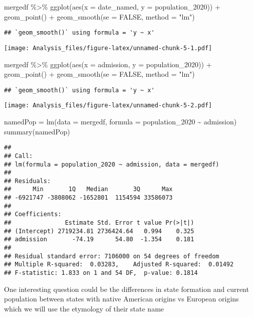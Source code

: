 \documentclass[
]{article}
\newenvironment{Shaded}{\begin{snugshade}}{\end{snugshade}}
\newcommand{\AttributeTok}[1]{\textcolor[rgb]{0.77,0.63,0.00}{#1}}
\newcommand{\ConstantTok}[1]{\textcolor[rgb]{0.00,0.00,0.00}{#1}}
\newcommand{\FunctionTok}[1]{\textcolor[rgb]{0.00,0.00,0.00}{#1}}
\newcommand{\NormalTok}[1]{#1}
\newcommand{\OtherTok}[1]{\textcolor[rgb]{0.56,0.35,0.01}{#1}}
\newcommand{\SpecialCharTok}[1]{\textcolor[rgb]{0.00,0.00,0.00}{#1}}
\newcommand{\StringTok}[1]{\textcolor[rgb]{0.31,0.60,0.02}{#1}}
\begin{document}
\begin{Shaded}
\begin{Highlighting}[]
\NormalTok{mergedf }\SpecialCharTok{\%\textgreater{}\%}
  \FunctionTok{ggplot}\NormalTok{(}\FunctionTok{aes}\NormalTok{(}\AttributeTok{x =}\NormalTok{ date\_named, }\AttributeTok{y =}\NormalTok{ population\_2020)) }\SpecialCharTok{+}
  \FunctionTok{geom\_point}\NormalTok{() }\SpecialCharTok{+}
  \FunctionTok{geom\_smooth}\NormalTok{(}\AttributeTok{se =} \ConstantTok{FALSE}\NormalTok{, }\AttributeTok{method =} \StringTok{"lm"}\NormalTok{)}
\end{Highlighting}
\end{Shaded}

\begin{verbatim}
## `geom_smooth()` using formula = 'y ~ x'
\end{verbatim}

\texttt{[image: Analysis\_files/figure-latex/unnamed-chunk-5-1.pdf]}

\begin{Shaded}
\begin{Highlighting}[]
\NormalTok{mergedf }\SpecialCharTok{\%\textgreater{}\%}
  \FunctionTok{ggplot}\NormalTok{(}\FunctionTok{aes}\NormalTok{(}\AttributeTok{x =}\NormalTok{ admission, }\AttributeTok{y =}\NormalTok{ population\_2020)) }\SpecialCharTok{+}
  \FunctionTok{geom\_point}\NormalTok{() }\SpecialCharTok{+}
  \FunctionTok{geom\_smooth}\NormalTok{(}\AttributeTok{se =} \ConstantTok{FALSE}\NormalTok{, }\AttributeTok{method =} \StringTok{"lm"}\NormalTok{)}
\end{Highlighting}
\end{Shaded}

\begin{verbatim}
## `geom_smooth()` using formula = 'y ~ x'
\end{verbatim}

\texttt{[image: Analysis\_files/figure-latex/unnamed-chunk-5-2.pdf]}

\begin{Shaded}
\begin{Highlighting}[]
\NormalTok{namedPop }\OtherTok{=} \FunctionTok{lm}\NormalTok{(}\AttributeTok{data =}\NormalTok{ mergedf, }\AttributeTok{formula =}\NormalTok{ population\_2020 }\SpecialCharTok{\textasciitilde{}}\NormalTok{ admission)}
\FunctionTok{summary}\NormalTok{(namedPop)}
\end{Highlighting}
\end{Shaded}

\begin{verbatim}
## 
## Call:
## lm(formula = population_2020 ~ admission, data = mergedf)
## 
## Residuals:
##      Min       1Q   Median       3Q      Max 
## -6921747 -3808062 -1652801  1154594 33586073 
## 
## Coefficients:
##               Estimate Std. Error t value Pr(>|t|)
## (Intercept) 2719234.81 2736424.64   0.994    0.325
## admission       -74.19      54.80  -1.354    0.181
## 
## Residual standard error: 7106000 on 54 degrees of freedom
## Multiple R-squared:  0.03283,    Adjusted R-squared:  0.01492 
## F-statistic: 1.833 on 1 and 54 DF,  p-value: 0.1814
\end{verbatim}

One interesting question could be the differences in state formation and
current population between states with native American origins vs
European origins which we will use the etymology of their state name
\end{document}
